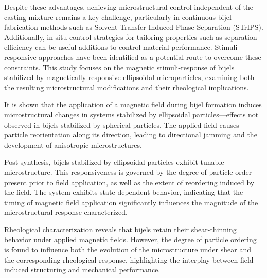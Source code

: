 \begin{front}
    Despite these advantages, achieving microstructural control independent of the casting mixture remains a 
    key challenge, particularly in continuous bijel fabrication methods such as Solvent Transfer Induced Phase 
    Separation (STrIPS). Additionally, in situ control strategies for tailoring properties such 
    as separation efficiency can be useful additions to control material performance. 
    Stimuli-responsive approaches have been identified as a potential route to 
    overcome these constraints. This study focuses on the magnetic stimuli-response of bijels stabilized by 
    magnetically responsive ellipsoidal microparticles, examining both the resulting microstructural 
    modifications and their rheological implications.

    It is shown that the application of a magnetic field during bijel formation induces microstructural 
    changes in systems stabilized by ellipsoidal particles—effects not observed in bijels stabilized by 
    spherical particles. The applied field causes particle reorientation along its direction, leading to 
    directional jamming and the development of anisotropic microstructures.

    Post-synthesis, bijels stabilized by ellipsoidal particles exhibit tunable microstructure. This responsiveness 
    is governed by the degree of particle order present prior to field application, as well as the extent of 
    reordering induced by the field. The system exhibits state-dependent behavior, indicating that the timing of 
    magnetic field application significantly influences the magnitude of the microstructural response characterized.

    Rheological characterization reveals that bijels retain their shear-thinning behavior under applied magnetic 
    fields. However, the degree of particle ordering is found to influence both the evolution of the microstructure 
    under shear and the corresponding rheological response, highlighting the interplay between field-induced 
    structuring and mechanical performance.
\end{front}